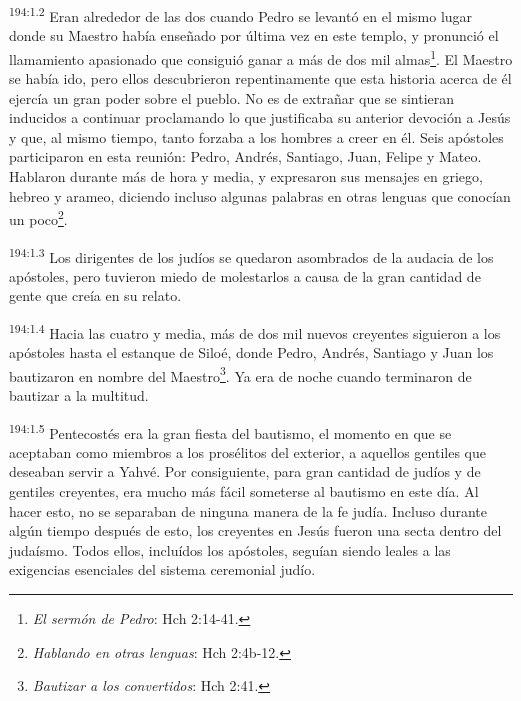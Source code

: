 \par 
\textsuperscript{194:1.2} Eran alrededor de las dos cuando Pedro se levantó en el mismo lugar donde su Maestro había enseñado por última vez en este templo, y pronunció el llamamiento apasionado que consiguió ganar a más de dos mil almas\footnote{\textit{El sermón de Pedro}: Hch 2:14-41.}. El Maestro se había ido, pero ellos descubrieron repentinamente que esta historia acerca de él ejercía un gran poder sobre el pueblo. No es de extrañar que se sintieran inducidos a continuar proclamando lo que justificaba su anterior devoción a Jesús y que, al mismo tiempo, tanto forzaba a los hombres a creer en él. Seis apóstoles participaron en esta reunión: Pedro, Andrés, Santiago, Juan, Felipe y Mateo. Hablaron durante más de hora y media, y expresaron sus mensajes en griego, hebreo y arameo, diciendo incluso algunas palabras en otras lenguas que conocían un poco\footnote{\textit{Hablando en otras lenguas}: Hch 2:4b-12.}.

\par 
\textsuperscript{194:1.3} Los dirigentes de los judíos se quedaron asombrados de la audacia de los apóstoles, pero tuvieron miedo de molestarlos a causa de la gran cantidad de gente que creía en su relato.

\par 
\textsuperscript{194:1.4} Hacia las cuatro y media, más de dos mil nuevos creyentes siguieron a los apóstoles hasta el estanque de Siloé, donde Pedro, Andrés, Santiago y Juan los bautizaron en nombre del Maestro\footnote{\textit{Bautizar a los convertidos}: Hch 2:41.}. Ya era de noche cuando terminaron de bautizar a la multitud.

\par 
\textsuperscript{194:1.5} Pentecostés era la gran fiesta del bautismo, el momento en que se aceptaban como miembros a los prosélitos del exterior, a aquellos gentiles que deseaban servir a Yahvé. Por consiguiente, para gran cantidad de judíos y de gentiles creyentes, era mucho más fácil someterse al bautismo en este día. Al hacer esto, no se separaban de ninguna manera de la fe judía. Incluso durante algún tiempo después de esto, los creyentes en Jesús fueron una secta dentro del judaísmo. Todos ellos, incluídos los apóstoles, seguían siendo leales a las exigencias esenciales del sistema ceremonial judío.

